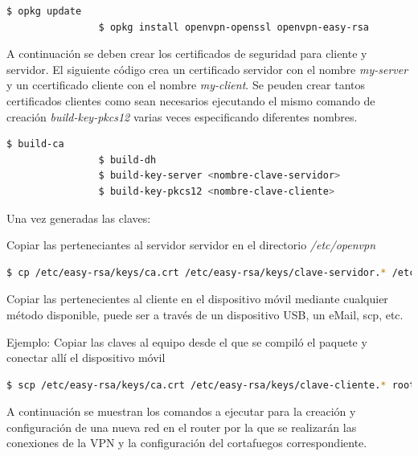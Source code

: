 \documentclass{article}
\begin{document}
            \begin{lstlisting}[language=bash]
                $ opkg update
                $ opkg install openvpn-openssl openvpn-easy-rsa
            \end{lstlisting}

            A continuación se deben crear los certificados de seguridad para cliente y servidor. El siguiente código crea un certificado servidor con el nombre \textit{my-server} y un ccertificado cliente con el nombre \textit{my-client}. Se peuden crear tantos certificados clientes como sean necesarios ejecutando el mismo comando de creación \textit{build-key-pkcs12} varias veces especificando diferentes nombres.

            \begin{lstlisting}[language=bash]
                $ build-ca
                $ build-dh
                $ build-key-server <nombre-clave-servidor>
                $ build-key-pkcs12 <nombre-clave-cliente>
            \end{lstlisting}

            Una vez generadas las claves:
            
                Copiar las perteneciantes al servidor servidor en el directorio \textit{/etc/openvpn}
            
                \begin{lstlisting}[language=bash]
                    $ cp /etc/easy-rsa/keys/ca.crt /etc/easy-rsa/keys/clave-servidor.* /etc/easy-rsa/keys/dh2048.pem /etc/openvpn
                \end{lstlisting}

                Copiar las pertenecientes al cliente en el dispositivo móvil mediante cualquier método disponible, puede ser a través de un dispositivo USB, un eMail, scp, etc.

                Ejemplo: Copiar las claves al equipo desde el que se compiló el paquete y conectar allí el dispositivo móvil
                \begin{lstlisting}[language=bash]
                    $ scp /etc/easy-rsa/keys/ca.crt /etc/easy-rsa/keys/clave-cliente.* root@192.168.0.100:/etc/openvpn
                \end{lstlisting}

            A continuación se muestran los comandos a ejecutar para la creación y configuración de una nueva red en el router por la que se realizarán las conexiones de la VPN y la configuración del cortafuegos correspondiente.
\end{document}
